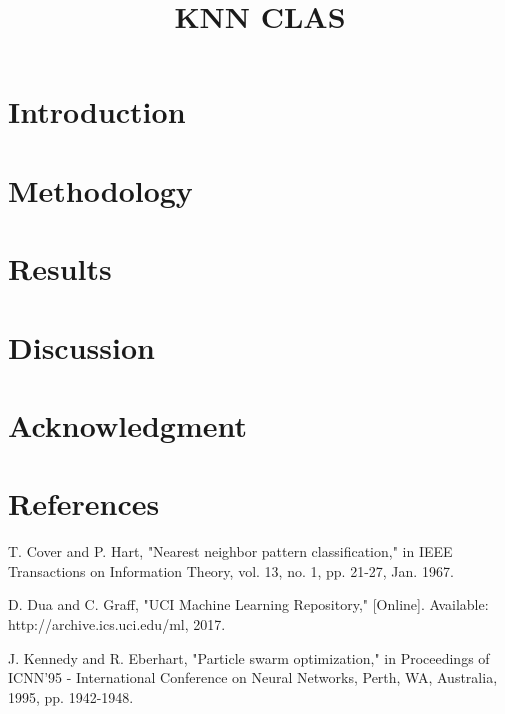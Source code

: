 \documentclass[conference]{IEEEtran}
\begin{document}
\title{KNN CLAS}

\author{
}

\maketitle

\begin{abstract}

\end{abstract}

\begin{IEEEkeywords}

\end{IEEEkeywords}

\section{Introduction}

\section{Methodology}

\section{Results}





\section{Discussion}

\section*{Acknowledgment}

\section*{References}

\begin{thebibliography}{00}
 T. Cover and P. Hart, "Nearest neighbor pattern classification," in IEEE Transactions on Information Theory, vol. 13, no. 1, pp. 21-27, Jan. 1967.

 D. Dua and C. Graff, "UCI Machine Learning Repository," [Online]. Available: http://archive.ics.uci.edu/ml, 2017.

 J. Kennedy and R. Eberhart, "Particle swarm optimization," in Proceedings of ICNN'95 - International Conference on Neural Networks, Perth, WA, Australia, 1995, pp. 1942-1948.
\end{thebibliography}
\end{document}
